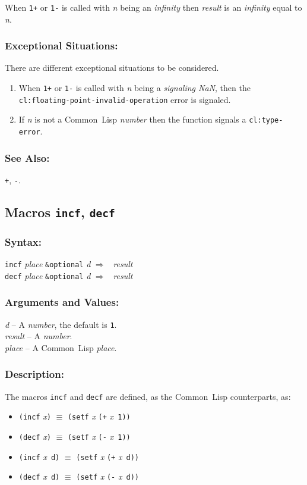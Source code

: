 \documentclass[10pt,fleqn]{article}
\newcommand{\CL}{\textsf{Common~Lisp}}
\newcommand{\code}[1]{\texttt{#1}}
\newcommand{\clieeeterm}[1]{\textit{#1}}
\newcommand{\varname}[1]{\textit{#1}}
\newcommand{\clterm}[1]{\textit{#1}}
\newcommand{\clname}[1]{\texttt{#1}}
\newcommand{\RArrow}{$\Rightarrow$}
\newcommand{\DDictionaryItem}[1]{\vspace*{6pt}\noindent\hrulefill\vspace*{-9pt}\subsection*{#1}}
\newcommand{\DSyntax}{\subsubsection*{Syntax:}}
\newcommand{\DArgsNValues}{\subsubsection*{Arguments and Values:}}
\newcommand{\DDescription}{\subsubsection*{Description:}}
\newcommand{\DExceptional}{\subsubsection*{Exceptional Situations:}}
\newcommand{\DSeeAlso}{\subsubsection*{See Also:}}
\begin{document}
When \code{1+} or \code{1-} is called with \varname{n} being an
\clieeeterm{infinity} then \varname{result}  is an
\clieeeterm{infinity} equal to \varname{n}.

\DExceptional{}

There are different exceptional situations to be considered.

\begin{enumerate}
\item When \code{1+} or \code{1-} is called with \varname{n}
  being a \emph{signaling NaN}, then the\\
  \clname{cl:floating-point-invalid-operation} error is signaled.

\item If \varname{n} is not a \CL{} \clterm{number} then the function
  signals a \clname{cl:type-error}.
\end{enumerate}

\DSeeAlso{}

\code{+}, \code{-}.


\DDictionaryItem{Macros \code{incf}, \code{decf}}
\index{I!\code{incf}}
\index{D!\code{decf}}

\DSyntax{}

\code{incf} \varname{place} \code{\&optional} \varname{d} \RArrow ~ \varname{result}\\
\code{decf} \varname{place} \code{\&optional} \varname{d} \RArrow ~ \varname{result}

\DArgsNValues{}

\varname{d} -- A \clterm{number}, the default is \code{1}.\\
\varname{result} -- A \clterm{number}.\\
\varname{place} -- A \CL{} \clterm{place}.\\


\DDescription{}

The macros \code{incf} and \code{decf} are defined,
as the \CL{} counterparts, as:
\begin{itemize}
\item \code{(incf} \varname{x}\code{)} $\equiv$ \code{(setf}
  \varname{x} \code{(+} \varname{x}\code{ 1))}
\item \code{(decf} \varname{x}\code{)} $\equiv$ \code{(setf}
  \varname{x} \code{(-} \varname{x}\code{ 1))}
\item \code{(incf} \varname{x}\code{ d)} $\equiv$ \code{(setf}
  \varname{x} \code{(+} \varname{x}\code{ d))}
\item \code{(decf} \varname{x}\code{ d)} $\equiv$ \code{(setf}
  \varname{x} \code{(-} \varname{x}\code{ d))}
\end{itemize}
\end{document}
